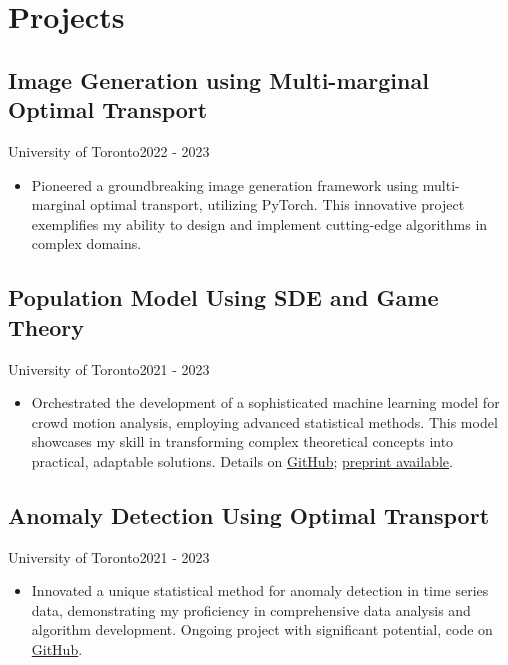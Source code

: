 \section{Projects}
\subsection{Image Generation using Multi-marginal Optimal Transport}{University of Toronto}{2022 - 2023}
\begin{itemize}[leftmargin=*]
    \item Pioneered a groundbreaking image generation framework using multi-marginal optimal transport, utilizing PyTorch. This innovative project exemplifies my ability to design and implement cutting-edge algorithms in complex domains.
\end{itemize}

\subsection{Population Model Using SDE and Game Theory}{University of Toronto}{2021 - 2023}
\begin{itemize}[leftmargin=*]
    \item Orchestrated the development of a sophisticated machine learning model for crowd motion analysis, employing advanced statistical methods. This model showcases my skill in transforming complex theoretical concepts into practical, adaptable solutions. Details on \href{https://github.com/Diebrate/population_model}{GitHub}; \href{https://www.biorxiv.org/content/10.1101/2023.08.10.552373v1}{preprint available}.
\end{itemize}

\subsection{Anomaly Detection Using Optimal Transport}{University of Toronto}{2021 - 2023}
\begin{itemize}[leftmargin=*]
    \item Innovated a unique statistical method for anomaly detection in time series data, demonstrating my proficiency in comprehensive data analysis and algorithm development. Ongoing project with significant potential, code on \href{https://github.com/Diebrate/scRNA_study}{GitHub}.
\end{itemize}

